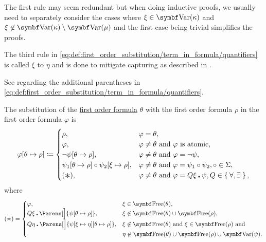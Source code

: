 \begin{definition}
\begin{DefEnum}
    The first rule may seem redundant but when doing inductive proofs, we usually need to separately consider the cases where \( \xi \in \Bold{Var}(\kappa) \) and \( \xi \not\in \Bold{Var}(\kappa) \setminus \Bold{Var}(\mu) \) and the first case being trivial simplifies the proofs.

    The third rule in \eqref{eq:def:first_order_substitution/term_in_formula/quantifiers} is called  \( \xi \) to \( \eta \) and is done to mitigate capturing as described in .

    See  regarding the additional parentheses in \eqref{eq:def:first_order_substitution/term_in_formula/quantifiers}.

     The substitution of the \hyperref[def:first_order_language/formula]{first order formula} \( \theta \) with the first order formula \( \rho \) in the first order formula \( \varphi \) is
    \begin{equation}\label{eq:def:first_order_substitution/formula_in_formula}
      \varphi[\theta \mapsto \rho] \coloneqq \begin{cases}
        \rho,                                                       &\varphi = \theta, \\
        \varphi,                                                    &\varphi \neq \theta \T{and} \varphi \text{ is atomic}, \\
        \neg \psi[\theta \mapsto \rho],                             &\varphi \neq \theta \T{and} \varphi = \neg \psi, \\
        \psi_1[\theta \mapsto \rho] \circ \psi_2[\xi \mapsto \rho], &\varphi \neq \theta \T{and} \varphi = \psi_1 \circ \psi_2, \circ \in \Sigma, \\
        (\Ast),                                                     &\varphi \neq \theta \T{and} \varphi = Q \xi \centerdot \psi, Q \in \Set{ \forall, \exists },
      \end{cases}
    \end{equation}
    where
    \begin{equation}\label{eq:def:first_order_substitution/formula_in_formula/quantifiers}
      (\Ast) = \begin{cases}
        \varphi,                                                                      &\xi \in \Bold{Free}(\theta), \\
        Q \xi \centerdot \Parens[\Big]{\psi[\theta \mapsto \rho]},                    &\xi \not\in \Bold{Free}(\theta) \cup \Bold{Free}(\rho), \\
        Q \eta \centerdot \Parens[\Big]{\psi[\xi \mapsto \eta][\theta \mapsto \rho]}, &\xi \not\in \Bold{Free}(\theta) \T{and} \xi \in \Bold{Free}(\rho) \T{and} \\
                                                                                      &\eta \not\in \Bold{Free}(\theta) \cup \Bold{Free}(\rho) \cup \Bold{Var}(\psi).
      \end{cases}
    \end{equation}


\end{DefEnum}
\end{definition}
